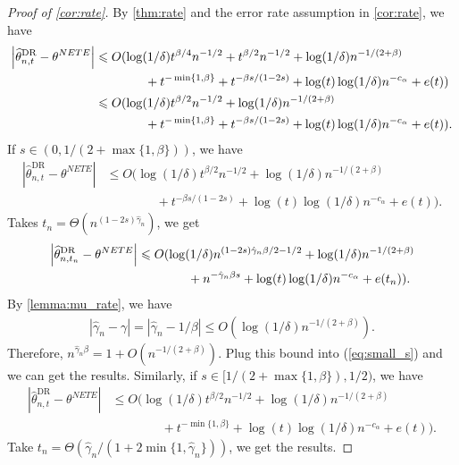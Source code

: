 \documentclass[10pt,a4paper]{amsart}
\begin{document}
\begin{proof}[Proof of \cref{cor:rate}]
    By \cref{thm:rate} and the error rate assumption in \cref{cor:rate},  we have
    \begin{align*}
    \left| {{\widehat{\theta }_{n, t}^{\text{DR} }} }   -
    \theta^{NETE} \right|  & \leqslant O (\log(1/\delta) t^{\beta/4}n^{-1/2} + t^{\beta / 2} n^{-1 / 2}+ \log (1 / \delta) n^{- 1 / (2 +\beta)}  \notag\\
    & \quad\quad \quad \quad + t^{- \min \{1, \beta\}}  + t^{- \beta s / (1 - 2 s)} + \log(t)\log(1/\delta) n^{-c_\alpha}+ e (t)) \\
    &\leqslant O (\log(1/\delta) t^{\beta/2}n^{-1/2}+ \log (1 / \delta) n^{- 1 / (2 +\beta)} \\
    & \quad\quad \quad \quad + t^{- \min \{1, \beta\}}  + t^{- \beta s / (1 - 2 s)} + \log(t)\log(1/\delta) n^{-c_\alpha}+ e (t)).
    \end{align*}
    If $s \in (0, 1 / (2 + \max \{1, \beta\}))$, we have 
    \begin{align*}
        \left| {{\widehat{\theta }_{n, t}^{\text{DR} }} }   -
    \theta^{NETE} \right| &\leqslant O (\log(1/\delta) t^{\beta/2}n^{-1/2}+ \log (1 / \delta) n^{- 1 / (2 +\beta)} \\
    &\quad\quad \quad \quad + t^{- \beta s / (1 - 2 s)} + \log(t)\log(1/\delta) n^{-c_\alpha}+ e (t)).
    \end{align*}
    Takes $t_n = \Theta(n^{(1-2s)\hat{\gamma}_n})$, we get
    \begin{align}
        \left| {{\widehat{\theta }_{n, t_n}^{\text{DR} }} }   -
    \theta^{NETE} \right| &\leqslant O (\log(1/\delta) n^{{(1-2s)\hat{\gamma}_n}\beta /2 -1/2}+ \log (1 / \delta) n^{- 1 / (2 +\beta)} \notag\\
    &\quad\quad\quad\quad+ n^{- \hat{\gamma}_n\beta s} + \log(t)\log(1/\delta) n^{-c_\alpha}+ e (t_n)).\label{eq:small_s}
    \end{align}
    By \cref{lemma:mu_rate}, we have 
    \begin{align*}
        |\hat{\gamma}_n - \gamma| = |\hat{\gamma}_n - 1/\beta| \leqslant O(\log(1/\delta)n^{-1/(2+\beta)}). 
    \end{align*}
    Therefore, $ n^{\hat{\gamma}_n \beta} = 1 + O( n^{-1/(2+\beta)}) $. Plug this bound into (\ref{eq:small_s}) and we can get the results. Similarly, if $s \in [ 1 / (2 + \max \{1, \beta\}), 1/2)$, we have 
    \begin{align*}
        \left| {{\widehat{\theta }_{n, t}^{\text{DR} }} }   -
    \theta^{NETE} \right| &\leqslant O (\log(1/\delta) t^{\beta/2}n^{-1/2}+ \log (1 / \delta) n^{- 1 / (2 +\beta)} \\
    &\quad\quad \quad \quad + t^{- \min\{1,\beta\}} + \log(t)\log(1/\delta) n^{-c_\alpha}+ e (t)).
    \end{align*}
    Take $t_n = \Theta(\hat{\gamma}_n / (1 + 2\min\{1, \hat{\gamma}_n\}))$, we get the results. 
\end{proof}
\end{document}
